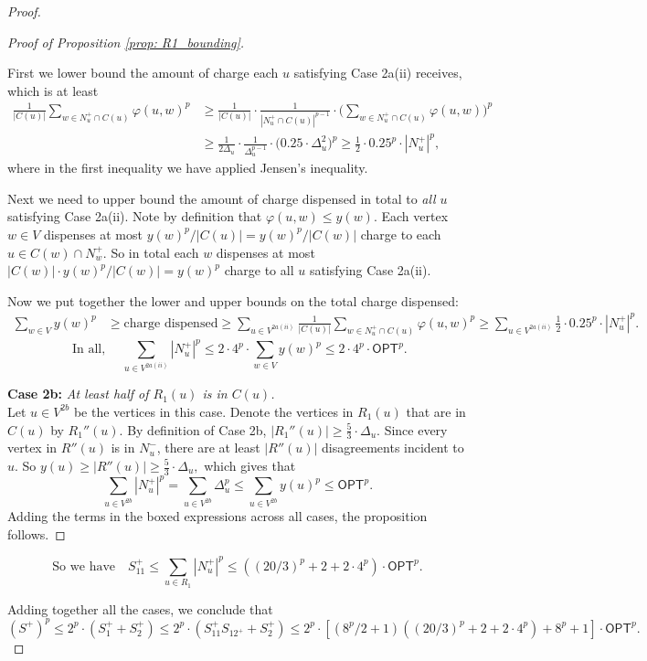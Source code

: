 \begin{proof}
\begin{proof}[Proof of Proposition \ref{prop: R1_bounding}]
\begin{itemize}
        First we lower bound the amount of charge each $u$ satisfying Case 2a(ii) receives, which is at least
        \begin{align*}
         \frac{1}{|C(u)|} \sum_{w \in N_u^+ \cap C(u)} \varphi(u,w)^p &\geq \frac{1}{|C(u)|} \cdot \frac{1}{|N_u^+ \cap C(u)|^{p-1}} \cdot \Big(\sum_{w \in N_u^+ \cap C(u)} \varphi(u,w) \Big)^p \\
         &\geq \frac{1}{2\Delta_u} \cdot \frac{1}{\Delta_u^{p-1}} \cdot \Big(0.25\cdot \Delta_u^2 \Big)^p 
         \geq \frac{1}{2} \cdot 0.25^p \cdot |N_u^+|^{p},
         \end{align*}
        where in the first inequality we have applied Jensen's inequality. 
    


    Next we need to upper bound the amount of charge dispensed in total to \textit{all} $u$ satisfying Case 2a(ii). Note by definition that $\varphi(u,w) \leq y(w)$. Each vertex $w \in V$ dispenses at most
    $y(w)^p/|C(u)| = y(w)^p/|C(w)|$
    charge to each $u \in C(w) \cap N_w^+$. So in total each $w$ dispenses at most 
    $|C(w)| \cdot y(w)^p/ |C(w)|  = y(w)^p$
    charge to all $u$ satisfying Case 2a(ii). 

    Now we put together the lower and upper bounds on the total charge dispensed:  
    \begin{align*}
        \sum_{w \in V} y(w)^p &\geq \text{charge dispensed} 
        \geq \sum_{u \in  V^{2a(ii)}} \frac{1}{|C(u)|} \sum_{w \in N_u^+ \cap C(u)} \varphi(u,w)^p 
        \geq \sum_{u \in  V^{2a(ii)}} \frac{1}{2} \cdot 0.25^p \cdot |N_u^+|^p.
    \end{align*}
    \[\text{  In all, } \quad \boxed{\sum_{u \in  V^{2a(ii)}} |N_u^+|^p \leq 2 \cdot 4^p \cdot \sum_{w \in V} y(w)^p \leq 2 \cdot 4^p \cdot \textsf{OPT}^p.}\]

    \end{itemize}

\noindent\textbf{Case 2b: }\emph{At least half of $R_1(u)$ is in $C(u)$.} \\
Let $ u \in  V^{2b}$ be the vertices in this case.
    Denote the vertices in $R_1(u)$ that are in $C(u)$ by $R_1''(u)$. By definition of Case 2b, $|R_1''(u)| \geq \frac{5}{3} \cdot \Delta_u$. Since every vertex in $R''(u)$ is in $N_u^-$, there are at least $|R''(u)|$ disagreements incident to $u$. So
    $y(u) \geq |R''(u)| \geq \frac{5}{3} \cdot \Delta_u,$
     which gives that
    \[ \boxed{\sum_{u \in V^{2b}} |N_u^+|^p = \sum_{u \in V^{2b}} \Delta_u^p \leq \sum_{u \in V^{2b}} y(u)^p \leq \textsf{OPT}^p.}\]
Adding the terms in the boxed expressions across all cases, the proposition follows. 
\end{proof} 
$$
\text{So we have} \quad 
\boxed{S_{11}^+ \leq \sum_{u \in R_1} |N_u^+|^p \leq \left((20/3)^p + 2 + 2 \cdot 4^p \right) \cdot \textsf{OPT}^p.}
$$

Adding together all the cases, we conclude that
$$
    (S^+)^p \leq 2^p \cdot (S_1^+ + S_2^+) 
    \leq 2^p \cdot (S_{11}^+ S_{12^+} + S_2^+) 
    \leq 2^p \cdot [(8^p/2 +1)((20/3)^p + 2 + 2 \cdot 4^p) + 8^p +1 ] \cdot \textsf{OPT}^p.
$$
\end{proof}
